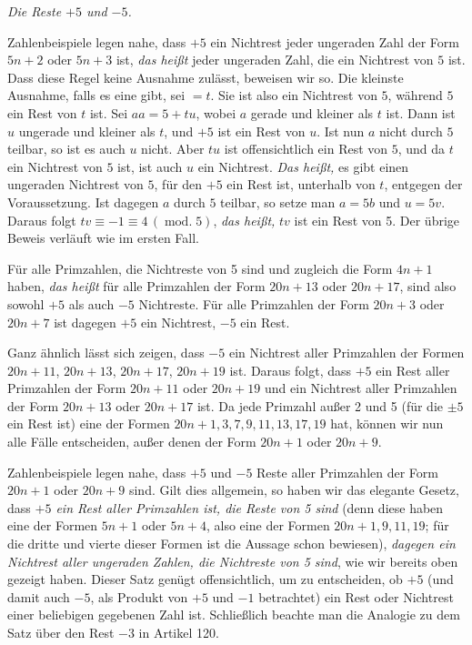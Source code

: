 \begin{center}\emph{Die Reste $+5$ und $-5$.}\end{center}

Zahlenbeispiele legen nahe, dass $+5$ ein Nichtrest jeder ungeraden Zahl der Form $5n+2$ oder $5n+3$ ist, \emph{das heißt} jeder ungeraden Zahl, die ein Nichtrest von $5$ ist. Dass diese Regel keine Ausnahme zulässt, beweisen wir so. Die kleinste Ausnahme, falls es eine gibt, sei $=t$. Sie ist also ein Nichtrest von $5$, während $5$ ein Rest von $t$ ist. Sei $aa=5+tu$, wobei $a$ gerade und kleiner als $t$ ist. Dann ist $u$ ungerade und kleiner als $t$, und $+5$ ist ein Rest von $u$. Ist nun $a$ nicht durch $5$ teilbar, so ist es auch $u$ nicht. Aber $tu$ ist offensichtlich ein Rest von $5$, und da $t$ ein Nichtrest von $5$ ist, ist auch $u$ ein Nichtrest. \emph{Das heißt,} es gibt einen ungeraden Nichtrest von $5$, für den $+5$ ein Rest ist, unterhalb von $t$, entgegen der Voraussetzung. Ist dagegen $a$ durch $5$ teilbar, so setze man $a=5b$ und $u=5v$. Daraus folgt $tv\equiv -1\equiv 4\,(\operatorname{mod.}5)$, \emph{das heißt,} $tv$ ist ein Rest von 5. Der übrige Beweis verläuft wie im ersten Fall.

Für alle Primzahlen, die Nichtreste von 5 sind und zugleich die Form $4n+1$ haben, \emph{das heißt} für alle Primzahlen der Form $20n+13$ oder $20n+17$, sind also sowohl $+5$ als auch $-5$ Nichtreste. Für alle Primzahlen der Form $20n+3$ oder $20n+7$ ist dagegen $+5$ ein Nichtrest, $-5$ ein Rest.

Ganz ähnlich lässt sich zeigen, dass $-5$ ein Nichtrest aller Primzahlen der Formen $20n+11$, $20n+13$, $20n+17$, $20n+19$ ist. Daraus folgt, dass $+5$ ein Rest aller Primzahlen der Form $20n+11$ oder $20n+19$ und ein Nichtrest aller Primzahlen der Form $20n+13$ oder $20n+17$ ist. Da jede Primzahl außer 2 und 5 (für die $\pm 5$ ein Rest ist) eine der Formen $20n+1,3,7,9,11,13,17,19$ hat, können wir nun alle Fälle entscheiden, außer denen der Form $20n+1$ oder $20n+9$.

Zahlenbeispiele legen nahe, dass $+5$ und $-5$ Reste aller Primzahlen der Form $20n+1$ oder $20n+9$ sind. Gilt dies allgemein, so haben wir das elegante Gesetz, dass \emph{$+5$ ein Rest aller Primzahlen ist, die Reste von 5 sind} (denn diese haben eine der Formen $5n+1$ oder $5n+4$, also eine der Formen $20n+1,9,11,19$; für die dritte und vierte dieser Formen ist die Aussage schon bewiesen), \emph{dagegen ein Nichtrest aller ungeraden Zahlen, die Nichtreste von 5 sind}, wie wir bereits oben gezeigt haben. Dieser Satz genügt offensichtlich, um zu entscheiden, ob $+5$ (und damit auch $-5$, als Produkt von $+5$ und $-1$ betrachtet) ein Rest oder Nichtrest einer beliebigen gegebenen Zahl ist. Schließlich beachte man die Analogie zu dem Satz über den Rest $-3$ in Artikel 120.

